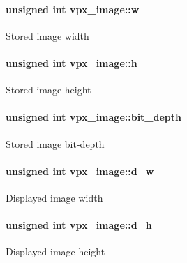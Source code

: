 \paragraph[{\texorpdfstring{w}{w}}]{\setlength{\rightskip}{0pt plus 5cm}unsigned int vpx\+\_\+image\+::w}\hypertarget{structvpx__image_ac7b7d569142f878155b28141653adcd6}{}\label{structvpx__image_ac7b7d569142f878155b28141653adcd6}
Stored image width 
\paragraph[{\texorpdfstring{h}{h}}]{\setlength{\rightskip}{0pt plus 5cm}unsigned int vpx\+\_\+image\+::h}\hypertarget{structvpx__image_a9d1070804dfe08cd5becd68d597fee69}{}\label{structvpx__image_a9d1070804dfe08cd5becd68d597fee69}
Stored image height 
\paragraph[{\texorpdfstring{bit\+\_\+depth}{bit_depth}}]{\setlength{\rightskip}{0pt plus 5cm}unsigned int vpx\+\_\+image\+::bit\+\_\+depth}\hypertarget{structvpx__image_aac11754e8f8e4fb9e7b3a721ce8be0f1}{}\label{structvpx__image_aac11754e8f8e4fb9e7b3a721ce8be0f1}
Stored image bit-\/depth 
\paragraph[{\texorpdfstring{d\+\_\+w}{d_w}}]{\setlength{\rightskip}{0pt plus 5cm}unsigned int vpx\+\_\+image\+::d\+\_\+w}\hypertarget{structvpx__image_a806bf23143bf00a0b3fdbd6ba030c483}{}\label{structvpx__image_a806bf23143bf00a0b3fdbd6ba030c483}
Displayed image width 
\paragraph[{\texorpdfstring{d\+\_\+h}{d_h}}]{\setlength{\rightskip}{0pt plus 5cm}unsigned int vpx\+\_\+image\+::d\+\_\+h}\hypertarget{structvpx__image_a31bc5f045d4f3c2b6bb0f57bb53078e7}{}\label{structvpx__image_a31bc5f045d4f3c2b6bb0f57bb53078e7}
Displayed image height 
